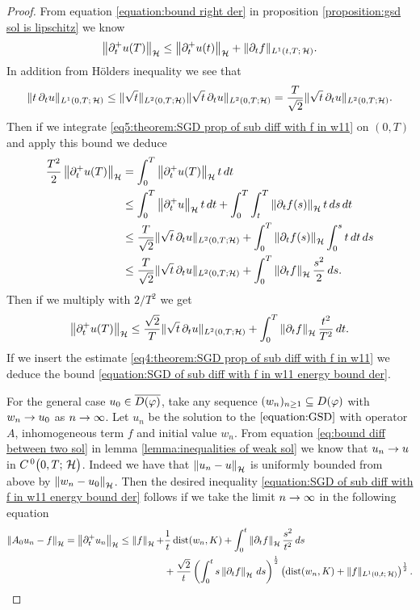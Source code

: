 \begin{proof}
	From equation \eqref{equation:bound right der} in proposition 
	\ref{proposition:gsd sol is lipschitz} we know
	\begin{align}\label{eq5:theorem:SGD prop of sub diff with f in w11}
		\left\Vert \partial_t^+ u(T)\right\Vert_{\mathcal{H}}
		\leq \left\Vert \partial_t^+ u(t)\right\Vert_{\mathcal{H}}
		+\Vert \partial_t f\Vert_{L^1(t,T;\,\mathcal{H})}.
	\end{align}
	In addition from Hölders inequality we see that
	\begin{align*}
		\Vert t\,\partial_t u\Vert_{L^1(0,T;\,\mathcal{H})}
		\leq \Vert \sqrt{t}\Vert_{L^2(0,T;\mathcal{H})}\Vert \sqrt{t}\,\partial_t u\Vert_{L^2(0,T;\mathcal{H})}
		=\frac{T}{\sqrt{2}}\Vert \sqrt{t}\,\partial_t u\Vert_{L^2(0,T;\mathcal{H})}.
	\end{align*}
	Then if we integrate \eqref{eq5:theorem:SGD prop of sub diff with f in w11}
	on $ (0,T) $ and apply this bound we deduce
	\begin{align*}
		\frac{T^2}{2}\left\Vert \partial_t^+ u(T)\right\Vert_{\mathcal{H}}
		&=\int_0^T \left\Vert \partial_t^+ u(T)\right\Vert_{\mathcal{H}}t\,dt\\
		&\leq \int_0^T \left\Vert \partial_t^+ u\right\Vert_{\mathcal{H}}t\,dt
		+\int_0^T \int_t^T \left\Vert \partial_t f(s)\right\Vert_{\mathcal{H}} t\,ds\,dt\\
		&\leq \frac{T}{\sqrt{2}}\Vert \sqrt{t}\,\partial_t u\Vert_{L^2(0,T;\mathcal{H})}
		+\int_{0}^T \left\Vert \partial_t f(s)\right\Vert_{\mathcal{H}}\int_0^s t\,dt\,ds\\
		&\leq \frac{T}{\sqrt{2}}\Vert \sqrt{t}\,\partial_t u\Vert_{L^2(0,T;\mathcal{H})}
		+\int_{0}^T \left\Vert \partial_t f\right\Vert_{\mathcal{H}} \frac{s^2}{2}\,ds.
	\end{align*}
	Then if we multiply with $ 2/T^2 $ we get
	\begin{align*}
		\left\Vert \partial_t^+ u(T)\right\Vert_{\mathcal{H}}
		\leq \frac{\sqrt{2}}{T}\Vert \sqrt{t}\,\partial_t u\Vert_{L^2(0,T;\mathcal{H})}
		+\int_0^T\left\Vert \partial_t f\right\Vert_{\mathcal{H}}\frac{t^2}{T^2}\,dt.
	\end{align*}
	If we insert the estimate \eqref{eq4:theorem:SGD prop of sub diff with f in w11}
	we deduce the bound 
	\eqref{equation:SGD of sub diff with f in w11 energy bound der}.\smallskip
	
	For the general case $ u_0\in\overline{D(\varphi)} $, take
	any sequence $ (w_n)_{n\geq 1}\subseteq D(\varphi) $ with $ w_n\rightarrow u_0 $
	as $ n\rightarrow \infty $. Let $ u_n $ be the solution to
	the $ \ref{equation:GSD} $ with operator $ A $,
	inhomogeneous term $ f $ and initial value $ w_n $.
	From equation \eqref{eq:bound diff between two sol}
	in lemma \ref{lemma:inequalities of weak sol} we 
	know that $ u_n\rightarrow u $ in $ C^{\, 0}\big(0,T;\,\mathcal{H}\big) $. Indeed we have 
	that $ \left\Vert u_n-u\right\Vert_{\mathcal{H}} $ is uniformly bounded from above by
	$ \left\Vert w_n-u_0\right\Vert_{\mathcal{H}} $. Then
	the desired inequality \eqref{equation:SGD of sub diff with f in w11 energy bound der}
	follows if we take the limit $ n\rightarrow \infty $ in the following
	equation
	\begin{align*}
		\left\Vert A_0 u_n-f\right\Vert_{\mathcal{H}}
		=\left\Vert \partial_t^+ u_n\right\Vert_{\mathcal{H}}
		\leq \left\Vert f\right\Vert_{\mathcal{H}}+&\frac{1}{t}\operatorname{\mathrm{dist}}(w_n, K)+\int_0^t\left\Vert \partial_t f\right\Vert_{\mathcal{H}}\frac{s^2}{t^2}\,ds\\
		&+\frac{\sqrt{2}}{t}
		\left(\int_0^t s \left\Vert \partial_t f\right\Vert_{\mathcal{H}}\, ds\right)^{\frac{1}{2}}
		\left(\operatorname{\mathrm{dist}}(w_n,K)+\Vert f\Vert_{L^1(0,t;\,\mathcal{H})}\right)^{\frac{1}{2}}.
	\end{align*}
\end{proof}


